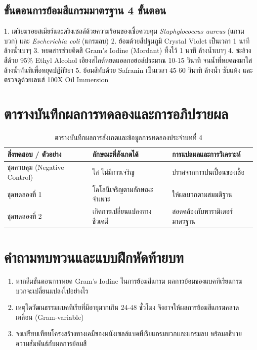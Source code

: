 \subsection{ขั้นตอนการย้อมสีแกรมมาตรฐาน 4 ขั้นตอน}
\begin{labprotocolbox}
1. เตรียมรอยสเมียร์และตรึงเซลล์ด้วยความร้อนของเชื้อควบคุม \textit{Staphylococcus aureus} (แกรมบวก) และ \textit{Escherichia coli} (แกรมลบ)
2. ย้อมด้วยสีปฐมภูมิ Crystal Violet เป็นเวลา 1 นาที ล้างน้ำเบาๆ
3. หยดสารช่วยติดสี Gram's Iodine (Mordant) ทิ้งไว้ 1 นาที ล้างน้ำเบาๆ
4. ชะล้างสีด้วย 95\% Ethyl Alcohol เอียงสไลด์หยดแอลกอฮอล์ประมาณ 10-15 วินาที จนน้ำที่หยดลงมาใส ล้างน้ำทันทีเพื่อหยุดปฏิกิริยา
5. ย้อมสีทับด้วย Safranin เป็นเวลา 45-60 วินาที ล้างน้ำ ซับแห้ง และตรวจดูด้วยเลนส์ 100X Oil Immersion
\end{labprotocolbox}

\section{ตารางบันทึกผลการทดลองและการอภิปรายผล}
\begin{table}[H]
\centering\small
\caption{ตารางบันทึกผลการสังเกตและข้อมูลการทดลองประจำบทที่ 4}
\label{tab:ch04_datasheet}
\begin{tabularx}{\textwidth}{p{} p{} X}
\toprule
\textbf{สิ่งทดสอบ / ตัวอย่าง} & \textbf{ลักษณะที่สังเกตได้} & \textbf{การแปลผลและการวิเคราะห์} \\
\midrule
ชุดควบคุม (Negative Control) & ใส ไม่มีการเจริญ & ปราศจากการปนเปื้อนของเชื้อ \\
ชุดทดลองที่ 1 & โคโลนีเจริญตามลักษณะจำเพาะ & ให้ผลบวกตามสมมติฐาน \\
ชุดทดลองที่ 2 & เกิดการเปลี่ยนแปลงทางชีวเคมี & สอดคล้องกับพารามิเตอร์มาตรฐาน \\
\bottomrule
\end{tabularx}
\end{table}

\section{คำถามทบทวนและแบบฝึกหัดท้ายบท}
\begin{enumerate}
    \item หากลืมขั้นตอนการหยด Gram's Iodine ในการย้อมสีแกรม ผลการย้อมของแบคทีเรียแกรมบวกจะเปลี่ยนแปลงไปอย่างไร
    \item เหตุใดวัฒนธรรมแบคทีเรียที่มีอายุมากเกิน 24-48 ชั่วโมง จึงอาจให้ผลการย้อมสีแกรมคลาดเคลื่อน (Gram-variable)
    \item จงเปรียบเทียบโครงสร้างทางเคมีของผนังเซลล์แบคทีเรียแกรมบวกและแกรมลบ พร้อมอธิบายความสัมพันธ์กับผลการย้อมสี
\end{enumerate}
